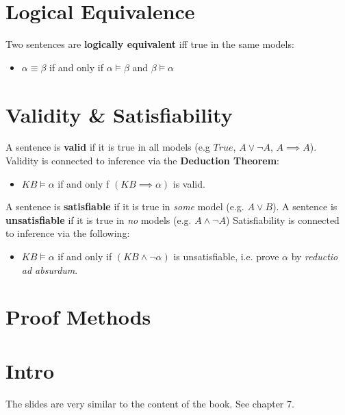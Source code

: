 \documentclass[11pt]{article}
\begin{document}
\section{Logical Equivalence}
\label{sec:org06d2780}
Two sentences are \textbf{logically equivalent} iff true in the same models:
\begin{itemize}
\item \(\alpha \equiv \beta\) if and only if \(\alpha \models \beta\) and \(\beta \models \alpha\)
\end{itemize}

\section{Validity \& Satisfiability}
\label{sec:orge996c99}
A sentence is \textbf{valid} if it is true in all models (e.g \(True\), \(A\lor\neg A\), \(A\implies A\)).
Validity is connected to inference via the \textbf{Deduction Theorem}:
\begin{itemize}
\item \(KB \models \alpha\) if and only f \((KB \implies \alpha)\) is valid.
\end{itemize}
A sentence is \textbf{satisfiable} if it is true in \emph{some} model (e.g. \(A\lor B\)).
A sentence is \textbf{unsatisfiable} if it is true in \emph{no} models (e.g. \(A\land \neg A\))
Satisfiability is connected to inference via the following:
\begin{itemize}
\item \(KB \models \alpha\) if and only if \((KB \land \neg \alpha)\) is unsatisfiable, i.e. prove \(\alpha\) by \emph{reductio ad absurdum}.
\end{itemize}

\section{Proof Methods}
\label{sec:org12fc565}

\maketitle
\tableofcontents


\section{Intro}
\label{sec:org8ac8ab8}
The slides are very similar to the content of the book.
See chapter 7.
\end{document}
